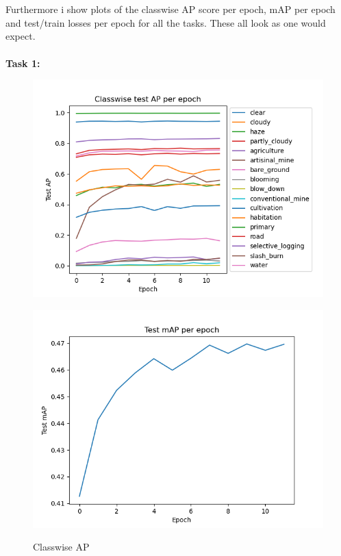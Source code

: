 \documentclass[12pt, letterpaper, twoside]{article}
\begin{document}
\ \\
\newpage
\ \\
Furthermore i show plots of the classwise AP score per epoch, mAP per epoch and test/train losses per epoch for all the tasks. These all look as one would expect.\\
\ \\
\textbf{Task 1:}\\
\begin{figure}[ht] 
  \begin{minipage}[b]{0.5\linewidth}
    \centering
    \includegraphics[scale=0.5]{"Task1_AP.png"}\\ 
    \caption{Classwise AP} 
    \vspace{4ex}
  \end{minipage}%
  \begin{minipage}[b]{0.5\linewidth}
    \centering
    \includegraphics[scale=0.5]{"Task1_mAP.png"}\\ 

\end{minipage}
\end{figure}
\end{document}
